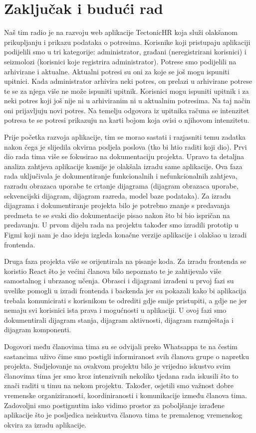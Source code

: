 \chapter{Zaključak i budući rad}
		
		Naš tim radio je na razvoju web aplikacije TectonicHR koja služi olakšanom prikupljanju i prikazu podataka o potresima. Korisnike koji pristupaju aplikaciji podijelili smo u tri kategorije: administrator, građani (neregistrirani korisnici) i seizmolozi (korisnici koje registrira administrator). Potrese smo podijelili na arhivirane i aktualne. Aktualni potresi su oni za koje se još mogu ispuniti upitnici. Kada administrator arhivira neki potres, on prelazi u arhivirane potrese te se za njega više ne može ispuniti upitnik. Korisnici mogu ispuniti upitnik i za neki potres koji još nije ni u arhiviranim ni u aktualnim potresima. Na taj način oni prijavljuju novi potres. Na temelju odgovora iz upitnika računa se intenzitet potresa te se potresi prikazuju na karti bojom koja ovisi o njihovom intenzitetu.
		
		Prije početka razvoja aplikacije, tim se morao sastati i razjasniti temu zadatka nakon čega je slijedila okvirna podjela poslova (tko bi htio raditi koji dio). Prvi dio rada tima više se fokusirao na dokumentaciju projekta. Upravo ta detaljna analiza zahtjeva aplikacije kasnije je olakšala izradu same aplikacije. Ova faza rada uključivala je dokumentiranje funkcionalnih i nefunkcionalnih zahtjeva, razradu obrazaca uporabe te crtanje dijagrama (dijagram obrazaca uporabe, sekvencijski dijagram, dijagram razreda, model baze podataka). Za izradu dijagrama i dokumentiranje projekta bilo je potrebno znanje s predavanja predmeta te se svaki dio dokumentacije pisao nakon što bi bio ispričan na predavanju. U prvom dijelu rada na projektu također smo izradili prototip u Figmi koji nam je dao ideju izgleda konačne verzije aplikacije i olakšao u izradi frontenda.
		
		Druga faza projekta više se orijentirala na pisanje koda. Za izradu frontenda se koristio React što je većini članova bilo nepoznato te je zahtijevalo više samostalnog i ubrzanog
		učenja. Obrasci i dijagrami izrađeni u prvoj fazi su uvelike pomogli u izradi frontenda i backenda jer su
		pokazali kako bi aplikacija trebala komunicirati s korisnikom te odrediti gdje smije pristupiti, a gdje ne jer nemaju svi korisnici ista prava i mogućnosti u aplikaciji. U ovoj fazi smo dokumentirali dijagram stanja, dijagram aktivnosti, dijagram razmještaja i dijagram komponenti.
		
		Dogovori među članovima tima su se odvijali preko Whatsappa te na čestim sastancima uživo čime smo postigli informiranost svih članova grupe o napretku projekta. Sudjelovanje na ovakvom projektu bilo je vrijedno iskustvo svim članovima tima jer smo kroz intenzivnih nekoliko tjedana rada iskusili što to znači raditi u timu na nekom projektu. Također, osjetili smo važnost dobre vremenske organiziranosti, koordiniranosti i komunikacije između članova tima. Zadovoljni smo postignutim iako vidimo prostor za poboljšanje izrađene aplikacije što je posljedica neiskustva članova tima te premalenog vremenskog okvira za izradu aplikacije.

		\eject 